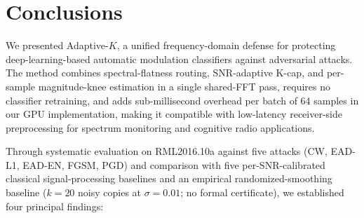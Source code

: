 \chapter{Conclusions}
\label{ch:conclusion}

We presented Adaptive-$K$, a unified frequency-domain defense for
protecting deep-learning-based automatic modulation classifiers against
adversarial attacks. The method combines spectral-flatness routing,
SNR-adaptive K-cap, and per-sample magnitude-knee estimation in a single
shared-FFT pass, requires no classifier retraining, and adds
sub-millisecond overhead per batch of 64 samples in our GPU implementation,
making it compatible with
low-latency receiver-side preprocessing for spectrum monitoring and
cognitive radio applications.

Through systematic evaluation on RML2016.10a against five attacks (CW,
EAD-L1, EAD-EN, FGSM, PGD) and comparison with five per-SNR-calibrated
classical signal-processing baselines and an empirical
randomized-smoothing baseline ($k = 20$ noisy copies at $\sigma = 0.01$;
no formal certificate), we established four principal findings:

